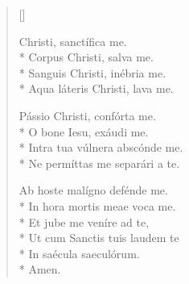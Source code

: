 \newHymn
{}

\begin{verse}[\versewidth]

 Christi, sanctífica me.\\*
Corpus Christi, salva me.\\*
Sanguis Christi, inébria me.\\*
Aqua láteris Christi, lava me.
\pointtrans

Pássio Christi, confórta me.\\*
O bone Iesu, exáudi me.\\*
Intra tua vúlnera abscónde me.\\*
Ne permíttas me separári a te.

Ab hoste malígno defénde me.\\*
In hora mortis meae voca me.\\*
Et jube me veníre ad te,\\*
Ut cum Sanctis tuis laudem te\\*
In saécula saeculórum.\\*
Amen.

\end{verse}






